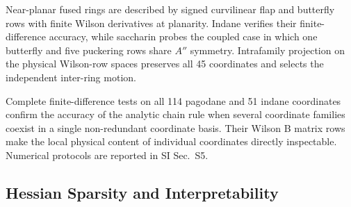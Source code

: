 \documentclass[journal=jctcce,manuscript=article,layout=traditional]{achemso}
\theoremstyle{definition}
\begin{document}
Near-planar fused rings are described by signed curvilinear flap and butterfly
rows with finite Wilson derivatives at planarity.  Indane verifies their
finite-difference accuracy, while saccharin probes the coupled case in which
one butterfly and five puckering rows share \(A''\) symmetry.  Intrafamily
projection on the physical Wilson-row spaces preserves all 45 coordinates and
selects the independent inter-ring motion.

Complete finite-difference tests on all 114 pagodane and 51 indane coordinates
confirm the accuracy of the analytic chain rule when several coordinate
families coexist in a single non-redundant {coordinate basis}.  Their Wilson B matrix rows make the local physical content of individual coordinates directly inspectable.  Numerical protocols are reported in SI Sec.~S5.

\subsection{Hessian Sparsity and Interpretability}
\label{sec:hessian-interpretability}
\end{document}
